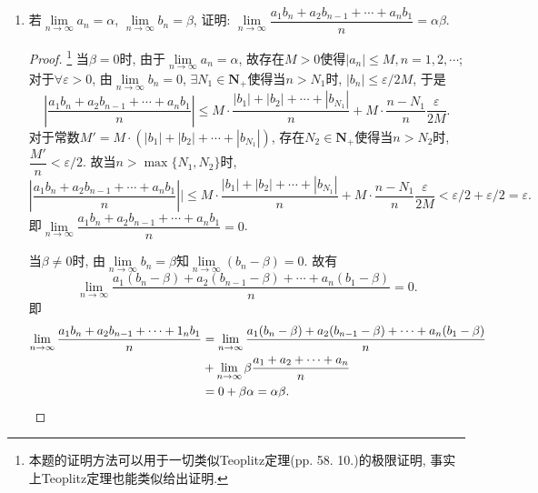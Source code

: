 \documentclass[a4paper,11pt,twoside]{ctexbook}
\begin{document}
\begin{enumerate}
\begin{proof}
		      又由$a_{n+1}=a_n(1-a_n)$, 同时取倒数就有
		      \[
			      \dfrac{1}{a_{n+1}}=\dfrac{1}{a_n(1-a_n)}=\dfrac{1}{a_n}+\dfrac{1}{1-a_n},
		      \]
		      故$\lim\limits_{n\to\infty} \dfrac{1}{a_{n+1}}-\dfrac{1}{a_n}=\lim\limits_{n\to\infty} \dfrac{1}{1-a_n}=1$. 由Cauchy命题可知$\lim\limits_{n\to\infty} \dfrac{1}{n}\sum\limits_{k=1}^{n-1}\left(\dfrac{1}{a_{k+1}}-\dfrac{1}{a_k}\right)=1$, 即$\lim\limits_{n\to\infty}\left(\dfrac{1}{na_n}-\dfrac{1}{na_1}\right)=1$. 于是就有$\lim\limits_{n\to\infty} \dfrac{1}{na_n}=1$, 故$\lim\limits_{n\to\infty} na_n=1$.\qedhere
	      \end{proof}
	\item 若$\lim\limits_{n\to\infty} a_n=\alpha$, $\lim\limits_{n\to\infty} b_n=\beta$, 证明: $\lim\limits_{n\to\infty} \dfrac{a_1b_n+a_2b_{n-1}+\cdots+a_nb_1}{n}=\alpha\beta$.
	      \begin{proof}
		      \footnote{本题的证明方法可以用于一切类似Teoplitz定理(pp. 58. 10.)的极限证明, 事实上Teoplitz定理也能类似给出证明.}
		      当$\beta=0$时, 由于$\lim\limits_{n\to\infty} a_n=\alpha$, 故存在$M>0$使得$|a_n|\leqslant M, n=1,2,\cdots$; 对于$\forall\varepsilon>0$, 由$\lim\limits_{n\to\infty} b_n=0$, $\exists N_1\in\mathbf{N}_{+}$使得当$n>N_1$时, $|b_n|\leqslant\varepsilon/2M$, 于是
		      \[
			      \left|\dfrac{a_1b_n+a_2b_{n-1}+\cdots+a_nb_1}{n}\right|\leqslant M\cdot\dfrac{|b_1|+|b_2|+\cdots+|b_{N_1}|}{n}+M\cdot\dfrac{n-N_1}{n}\dfrac{\varepsilon}{2M}.
		      \]
		      对于常数$M'=M\cdot(|b_1|+|b_2|+\cdots+|b_{N_1}|)$, 存在$N_2\in\mathbf{N}_{+}$使得当$n>N_2$时, $\dfrac{M'}{n}<\varepsilon/2$. 故当$n>\max\{N_1,N_2\}$时,
		      \[
			      \left|\dfrac{a_1b_n+a_2b_{n-1}+\cdots+a_nb_1}{n}\right||\leqslant M\cdot\dfrac{|b_1|+|b_2|+\cdots+|b_{N_1}|}{n}+M\cdot\dfrac{n-N_1}{n}\dfrac{\varepsilon}{2M}<\varepsilon/2+\varepsilon/2=\varepsilon.
		      \]
		      即$\lim\limits_{n\to\infty} \dfrac{a_1b_n+a_2b_{n-1}+\cdots+a_nb_1}{n}=0$.

		      当$\beta\neq 0$时, 由$\lim\limits_{n\to\infty} b_n=\beta$知$\lim\limits_{n\to\infty} (b_n-\beta)=0$. 故有
		      \[
			      \lim\limits_{n\to\infty} \dfrac{a_1(b_n-\beta)+a_2(b_{n-1}-\beta)+\cdots+a_n(b_1-\beta)}{n}=0.
		      \]
		      即
		      \begin{equation*}
			      \begin{split}
				      \lim\limits_{n\to\infty} \dfrac{a_1b_n+a_2b_{n-1}+\cdots+1_nb_1}{n}&= \lim\limits_{n\to\infty} \dfrac{a_1(b_n-\beta)+a_2(b_{n-1}-\beta)+\cdots+a_n(b_1-\beta)}{n}\\
				      &+\lim\limits_{n\to\infty} \beta\dfrac{a_1+a_2+\cdots+a_n}{n}\\
				      &=0+\beta\alpha=\alpha\beta.\qedhere
			      \end{split}
		      \end{equation*}
	      \end{proof}
\end{enumerate}
\end{document}
